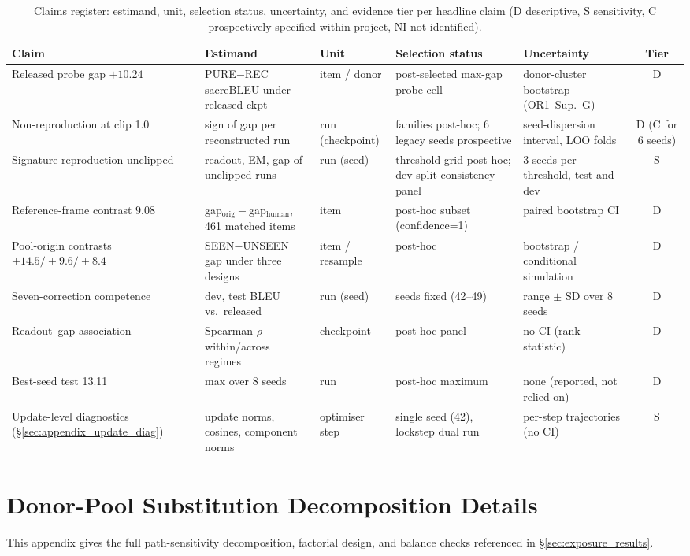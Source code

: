\documentclass[pdflatex,sn-chicago]{sn-jnl}
\begin{document}
\begin{table}[h]
\centering
\footnotesize\setlength{\tabcolsep}{3pt}
\caption{Claims register: estimand, unit, selection status, uncertainty, and evidence tier per headline claim (D descriptive, S sensitivity, C prospectively specified within-project, NI not identified).}
\label{tab:claims_register}
\begin{tabular}{p{2.9cm}p{2.6cm}p{1.3cm}p{2.0cm}p{2.4cm}c}
\toprule
Claim & Estimand & Unit & Selection status & Uncertainty & Tier \\
\midrule
Released probe gap $+10.24$ & PURE$-$REC sacreBLEU under released ckpt & item / donor & post-selected max-gap probe cell & donor-cluster bootstrap (OR1~Sup.~G) & D \\
Non-reproduction at clip 1.0 & sign of gap per reconstructed run & run (checkpoint) & families post-hoc; 6 legacy seeds prospective & seed-dispersion interval, LOO folds & D (C for 6 seeds) \\
Signature reproduction unclipped & readout, EM, gap of unclipped runs & run (seed) & threshold grid post-hoc; dev-split consistency panel & 3 seeds per threshold, test and dev & S \\
Reference-frame contrast $9.08$ & gap$_{\text{orig}}-$gap$_{\text{human}}$, 461 matched items & item & post-hoc subset (confidence=1) & paired bootstrap CI & D \\
Pool-origin contrasts $+14.5/+9.6/+8.4$ & SEEN$-$UNSEEN gap under three designs & item / resample & post-hoc & bootstrap / conditional simulation & D \\
Seven-correction competence & dev, test BLEU vs.\ released & run (seed) & seeds fixed (42--49) & range $\pm$ SD over 8 seeds & D \\
Readout--gap association & Spearman $\rho$ within/across regimes & checkpoint & post-hoc panel & no CI (rank statistic) & D \\
Best-seed test 13.11 & max over 8 seeds & run & post-hoc maximum & none (reported, not relied on) & D \\
Update-level diagnostics (\S\ref{sec:appendix_update_diag}) & update norms, cosines, component norms & optimiser step & single seed (42), lockstep dual run & per-step trajectories (no CI) & S \\
\bottomrule
\end{tabular}
\end{table}

\section{Donor-Pool Substitution Decomposition Details}
\label{sec:appendix_decomposition}
This appendix gives the full path-sensitivity decomposition, factorial design, and balance checks referenced in \S\ref{sec:exposure_results}.
\end{document}
